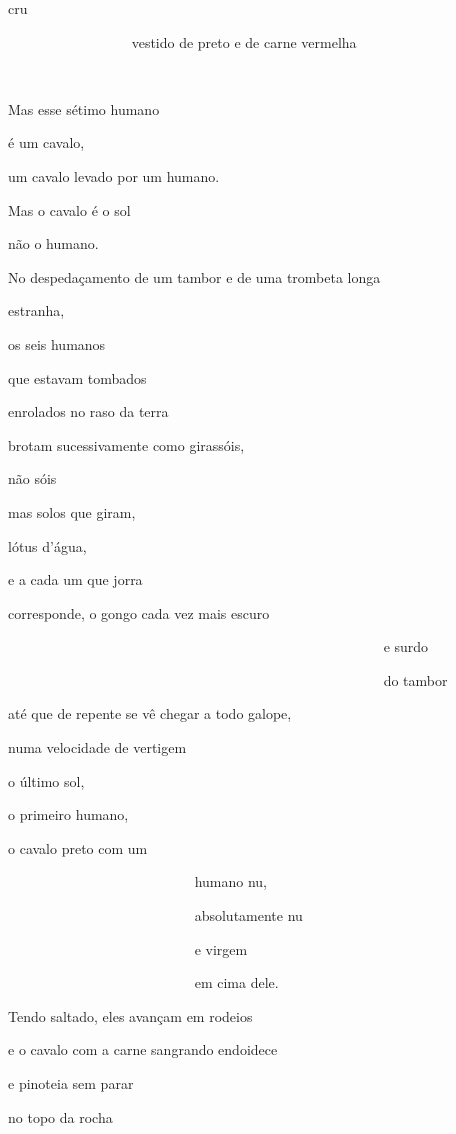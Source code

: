 cru

~~~~~~~~~~~~~~~~~ vestido de preto e de carne vermelha

~

Mas esse sétimo humano

é um cavalo,


um cavalo levado por um humano.


Mas o cavalo é o sol

não o humano.

No despedaçamento de um tambor e de uma trombeta longa

estranha, 

os seis humanos

que estavam tombados

enrolados no raso da terra

brotam sucessivamente como girassóis,

não sóis

mas solos que giram,

lótus d'água, 

e a cada um que jorra

corresponde, o gongo cada vez mais escuro

~~~~~~~~~~~~~~~~~~~~~~~~~~~~~~~~~~~~~~~~~~~~~~~~~~~~~ e surdo

~~~~~~~~~~~~~~~~~~~~~~~~~~~~~~~~~~~~~~~~~~~~~~~~~~~~~ do tambor

até que de repente se vê chegar a todo galope,

numa velocidade de vertigem

o último sol, 

o primeiro humano,

o cavalo preto com um

~~~~~~~~~~~~~~~~~~~~~~~~~~ humano nu, 

~~~~~~~~~~~~~~~~~~~~~~~~~~ absolutamente nu

~~~~~~~~~~~~~~~~~~~~~~~~~~ e virgem

~~~~~~~~~~~~~~~~~~~~~~~~~~ em cima dele.

Tendo saltado, eles avançam em rodeios

e o cavalo com a carne sangrando endoidece

e pinoteia sem parar

no topo da rocha

